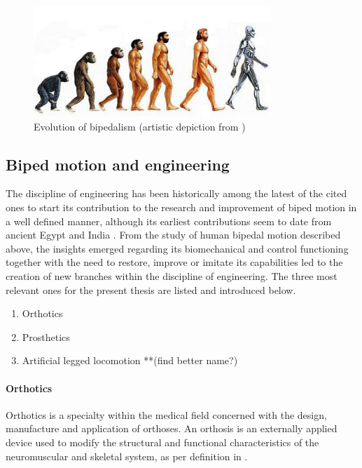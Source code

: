 \begin{figure}[h]
	\centering
	\includegraphics[width=0.8\textwidth]{figures/artificialhumans.jpg}
	\caption{Evolution of bipedalism (artistic depiction from \cite{human_evol_fig})}
	\label{fig:biped_evolution}
\end{figure}

\subsection{Biped motion and engineering} %
\label{sub:bipedalism_and_engineering}
The discipline of engineering has been historically among the latest of the cited ones to start its contribution to the research and improvement of biped motion in a well defined manner, although its earliest contributions seem to date from ancient Egypt and India \cite{prosthetics_history}.
From the study of human bipedal motion described above, the insights emerged regarding its biomechanical and control functioning together with the need to restore, improve or imitate its capabilities led to the creation of new branches within the discipline of engineering.
The three most relevant ones for the present thesis are listed and introduced below.

\begin{enumerate}
	\item Orthotics
	\item Prosthetics
	\item Artificial legged locomotion  **(find better name?)
\end{enumerate}

\paragraph{Orthotics} %
\label{par:orthotics}
Orthotics is a specialty within the medical field concerned with the design, manufacture and application of orthoses. An orthosis is an externally applied device used to modify the structural and functional characteristics of the neuromuscular and skeletal system, as per definition in \cite{ISO_orthosis}.

